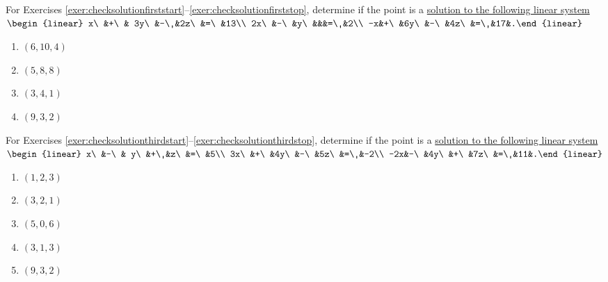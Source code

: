 \noindent For Exercises \ref{exer:checksolutionfirststart}--\ref{exer:checksolutionfirststop}, determine if the point is a \hyperref[def:linearsystem]{solution to the following linear system}\\ $\begin{linear} x\ &+\ & 3y\ &-\ &2z\ &=\ &13\\ 2x\ &-\ &y\ &&&=\ &2\\ -x&+\ &6y\ &-\ &4z\ &=\ &17&.\end{linear}$   %
\begin{multicols}{4}
\begin{enumerate}[!HW!, label=$\spadesuit$ \arabic*., ref=\arabic*]
\item\label{exer:checksolutionfirststart} $(6,10,4)$
\item $(5,8,8)$ 
\item $(3,4,1)$
\item \label{exer:checksolutionfirststop} $(9,3,2)$
\end{enumerate}
\end{multicols}\vs


\noindent For Exercises  \ref{exer:checksolutionthirdstart}--\ref{exer:checksolutionthirdstop}, determine if the point is a \hyperref[def:linearsystem]{solution to the following linear system}\\ $\begin{linear} x\ &-\ & y\ &+\ &z\ &=\ &5\\ 3x\ &+\ &4y\ &-\ &5z\ &=\ &-2\\ -2x&-\ &4y\ &+\ &7z\ &=\ &11&.\end{linear}$   %
\begin{multicols}{5}
\begin{enumerate}[!HW!]
\item\label{exer:checksolutionthirdstart} $(1,2,3)$
\item $(3,2,1)$ 
\item $(5,0,6)$
\item $(3,1,3)$
\item \label{exer:checksolutionthirdstop} $(9,3,2)$
\end{enumerate}
\end{multicols}\vs

